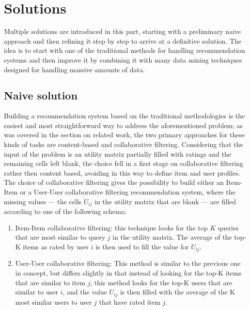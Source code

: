 \section{Solutions}
Multiple solutions are introduced in this part, starting with a preliminary naive approach and then refining it step by step to arrive at a definitive solution. The idea is to start with one of the traditional methods for handling recommendation systems and then improve it by combining it with many data mining techniques designed for handling massive amounts of data. 

\subsection{Naive solution}
\label{naive_solution}
Building a recommendation system based on the traditional methodologies is the easiest and most straightforward way to address the aforementioned problem; as was covered in the section on related work, the two primary approaches for these kinds of tasks are content-based and collaborative filtering. Considering that the input of the problem is an utility matrix partially filled with ratings and the remaining cells left blank, the choice fell in a first stage on collaborative filtering rather then content based, avoiding in this way to define item and user profiles. The choice of collaborative filtering gives the possibility to build either an Item-Item or a User-User collaborative filtering recommendation system, where the missing values — the cells $U_{ij}$ in the utility matrix that are blank — are filled according to one of the following schema:
\begin{enumerate}
    \item Item-Item collaborative filtering: this technique looks for the top $K$ queries that are most similar to query $j$ in the utility matrix. The average of the top-K items as rated by user $i$ is then used to fill the value for $U_{ij}$.
    \item User-User collaborative filtering: This method is similar to the previous one in concept, but differs slightly in that instead of looking for the top-K items that are similar to item $j$, this method looks for the top-K users that are similar to user $i$, and the value $U_{ij}$ is then filled with the average of the K most similar users to user $j$ that have rated item $j$. 
\end{enumerate}

